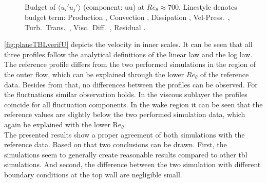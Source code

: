 \begin{figure}[H]
\centering
\begin{subfigure}[t]{0.495\textwidth}
    \subcaption{}
    \centering
    
    \label{fig:planeTBLverifU}
\end{subfigure}
\hfill
\begin{subfigure}[t]{0.495\textwidth}
    \centering
    \subcaption{}
    
    \label{fig:planeTBLverifFluct}
\end{subfigure}
\\[-20pt]
\begin{subfigure}[t]{0.495\textwidth}
    \centering
    \subcaption{}
    
    \label{fig:planeTBLverifBeta}
\end{subfigure}
\hfill
\begin{subfigure}[t]{0.495\textwidth}
    \centering
    \subcaption{}
    
    \label{fig:planeTBLverifBudget}
\end{subfigure}
\caption{Budget of $\langle u_i' u_j' \rangle$ (component: uu) at $Re_\theta \approx 700$.
Linestyle denotes budget term:
Production ,
Convection ,
Dissipation ,
Vel-Press.\ ,
Turb.\ Trans.\ ,
Visc.\ Diff.\ ,
Residual .}
\label{fig:planeTBLVerif}
\end{figure}

\autoref{fig:planeTBLverifU} depicts the velocity in inner scales.
It can be seen that all three profiles follow the analytical definitions of the linear law and the log law.
The reference profile differs from the two performed simulations in the region of the outer flow, which can be explained through the lower $Re_{\theta}$ of the reference data.
Besides from that, no differences between the profiles can be observed.
For the fluctuations similar observation holds.
In the viscous sublayer the profiles coincide for all fluctuation components.
In the wake region it can be seen that the reference values are slightly below the two performed simulation data, which again be explained with the lower $\mathrm{Re}_{\theta}$. \\
The presented results show a proper agreement of both simulations with the reference data.
Based on that two conclusions can be drawn.
First, the simulations seem to generally create reasonable results compared to other \acrshort{tbl} simulations.
And second, the difference between the two simulation with different boundary conditions at the top wall are negligible small.


